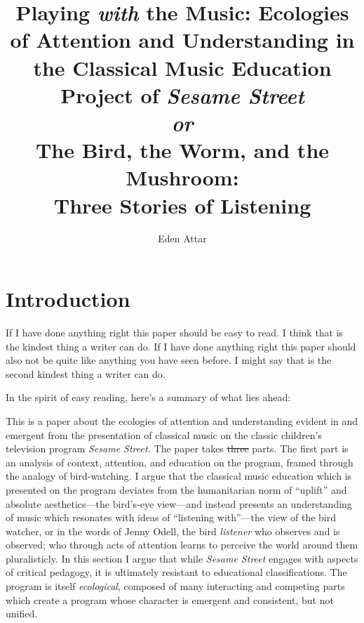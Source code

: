 \documentclass[12pt,letterpaper]{article}
\providecommand{\DIFadd}[1]{{\protect\color{blue}\uwave{#1}}} %
\providecommand{\DIFdel}[1]{{\protect\color{red}\sout{#1}}}                      %
\providecommand{\DIFaddbegin}{} %
\providecommand{\DIFaddend}{} %
\providecommand{\DIFdelbegin}{} %
\providecommand{\DIFdelend}{} %
\newcommand{\DIFscaledelfig}{0.5}
\newlength{\DIFdelgraphicswidth} %
\newlength{\DIFdelgraphicsheight} %
\newcommand{\DIFaddincludegraphics}[2][]{{\color{blue}\fbox{\DIFOincludegraphics[#1]{#2}}}} %
\newcommand{\DIFdelincludegraphics}[2][]{%
\sbox{\DIFdelgraphicsbox}{\DIFOincludegraphics[#1]{#2}}%
\settoboxwidth{\DIFdelgraphicswidth}{\DIFdelgraphicsbox} %
\settoboxtotalheight{\DIFdelgraphicsheight}{\DIFdelgraphicsbox} %
\scalebox{\DIFscaledelfig}{%
\parbox[b]{\DIFdelgraphicswidth}{\usebox{\DIFdelgraphicsbox}\\[-\baselineskip] \rule{\DIFdelgraphicswidth}{0em}}\llap{\resizebox{\DIFdelgraphicswidth}{\DIFdelgraphicsheight}{%
\setlength{\unitlength}{\DIFdelgraphicswidth}%
\begin{picture}(1,1)%
\thicklines\linethickness{2pt} %
{\color[rgb]{1,0,0}\put(0,0){\framebox(1,1){}}}%
{\color[rgb]{1,0,0}\put(0,0){\line( 1,1){1}}}%
{\color[rgb]{1,0,0}\put(0,1){\line(1,-1){1}}}%
\end{picture}%
}\hspace*{3pt}}} %
} %
\DeclareRobustCommand{\DIFaddbegin}{\DIFOaddbegin \let\includegraphics\DIFaddincludegraphics} %
\DeclareRobustCommand{\DIFaddend}{\DIFOaddend \let\includegraphics\DIFOincludegraphics} %
\DeclareRobustCommand{\DIFdelbegin}{\DIFOdelbegin \let\includegraphics\DIFdelincludegraphics} %
\DeclareRobustCommand{\DIFdelend}{\DIFOaddend \let\includegraphics\DIFOincludegraphics} %
\begin{document}
	\title{Playing \textit{with} the Music: Ecologies of Attention and 
	Understanding in the Classical Music Education Project of 
	\textit{Sesame Street}\\
	\vspace*{12pt}
	\large
	\textit{or}\\
	\vspace*{12pt}
	\Large
	The Bird, the Worm, and the Mushroom:\\ Three Stories of Listening}
	\author{Eden Attar}
	\maketitle
	\doublespacing
	\thispagestyle{empty}
	\newpage
	\clearpage
	\setcounter{page}{1}
	\thispagestyle{empty}
	\frenchspacing

	\section*{Introduction}	

	If I have done anything right this paper should be easy to read. I
	think that is the kindest thing a writer can do. If I have
	done anything right this paper should also not be quite like anything 
	you have seen before. I might say that is the second kindest thing a 
	writer can do.  

	In the spirit of easy reading, here's a summary of what lies ahead:

	This is a paper about the ecologies of attention and understanding 
	evident in and emergent from the presentation of classical music on the
	classic children's television program \textit{Sesame Street.}  
	The paper takes \DIFdelbegin \DIFdel{three }\DIFdelend \DIFaddbegin \DIFadd{two }\DIFaddend parts. The first part is an analysis of context,
	attention, and education on the program, framed through the analogy of
	bird-watching. I argue that the classical music education which is 
	presented on the program deviates from the humanitarian norm of 
	``uplift'' and absolute aesthetics---the bird's-eye view---and instead
	presents an understanding of music which resonates with ideas of 
	``listening with''---the view of the bird watcher, or in the words of
	Jenny Odell, the bird \textit{listener} who observes and is observed;
	who through acts of attention learns to perceive the world around them
	pluralisticly. In this section I argue that while \textit{Sesame
	Street} engages with aspects of critical pedagogy, it is ultimately 
	resistant to educational classifications. The program is itself
	\textit{ecological}, composed of many interacting and competing parts
	which create a program whose character is emergent and consistent, but
	not unified.   
\end{document}
